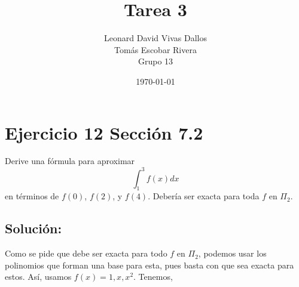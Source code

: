 \documentclass[12pt]{article}
\title{Tarea 3}
\author{Leonard David Vivas Dallos \\ Tomás Escobar Rivera \\ Grupo 13}
\date{\today}
\begin{document}
\maketitle

\tableofcontents

\renewcommand{\thesubsection}{\thesection.\alph{subsection}}

\section{Ejercicio 12 Sección 7.2}

Derive una fórmula para aproximar
\begin{equation*}
    \int_1^3 f(x)dx
\end{equation*}
en términos de $f(0)$, $f(2)$, y $f(4)$. Debería ser exacta para toda $f$ en $\Pi_2$.

\subsection{Solución:}

Como se pide que debe ser exacta para todo $f$ en $\Pi_2$, podemos usar los polinomios que forman una base para esta, pues basta con que sea exacta para estos. Así, usamos $f(x) = 1, x, x^2$. Tenemos,
\end{document}
